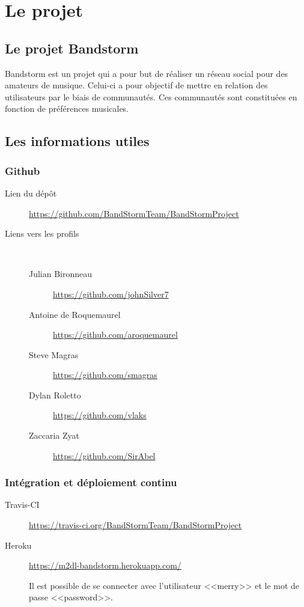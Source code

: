 \documentclass[12pt,a4paper,oneside]{book}
\begin{document}
	\thispagestyle{empty} %
	\titleBC

	\setcounter{tocdepth}{1}
	\setcounter{secnumdepth}{3}
	\setcounter{minitocdepth}{1}
	
	\tableofcontents
	\chapter{Le projet}
	\section{Le projet Bandstorm}
	Bandstorm est un projet qui a pour but de réaliser un réseau social pour des amateurs de musique. Celui-ci a pour objectif de mettre en relation des utilisateurs par le biais de
	communautés. Ces communautés sont constituées en fonction de préférences musicales.

	\section{Les informations utiles}
	\subsection{Github}
	\begin{description}
		\item[Lien du dépôt] \url{https://github.com/BandStormTeam/BandStormProject}~\\
		\item[Liens vers les profils]~
			\begin{description}
				\item[Julian Bironneau] \url{https://github.com/johnSilver7}
				\item[Antoine de Roquemaurel] \url{https://github.com/aroquemaurel}
				\item[Steve Magras] \url{https://github.com/smagras}
				\item[Dylan Roletto] \url{https://github.com/vlaks} 
				\item[Zaccaria Zyat] \url{https://github.com/SirAbel}
			\end{description}
	\end{description}

	\subsection{Intégration et déploiement continu}
	\begin{description}
		\item[Travis-CI] \url{https://travis-ci.org/BandStormTeam/BandStormProject }
		\item[Heroku] \url{https://m2dl-bandstorm.herokuapp.com/}~\\
			\begin{exemple}
				Il est possible de se connecter avec l'utilisateur <<merry>> et le mot de passe <<password>>.
			\end{exemple}
	\end{description}
\end{document}
